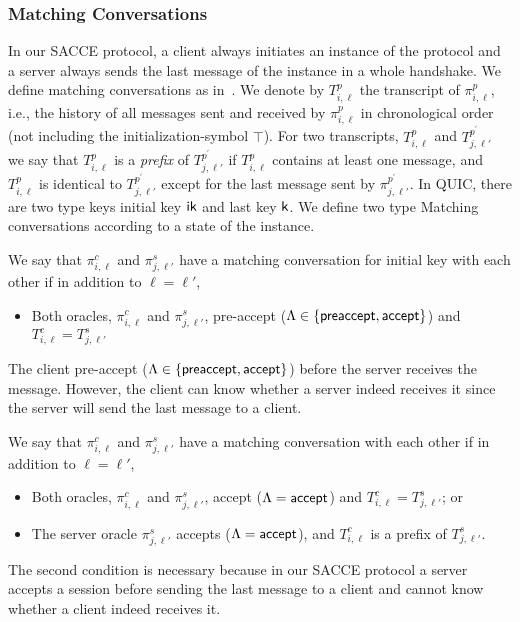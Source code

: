 \subsubsection{Matching Conversations}
In our SACCE protocol, a client always initiates an
instance of the protocol and a server always sends the
last message of the instance in a whole handshake.
We define matching conversations as in~\cite{JKSS12:ACCE}.
We denote by $T^p_{i,\ell}$ the transcript of
$\pi^p_{i,\ell}$, i.e., the history of all messages sent
and received by $\pi^p_{i,\ell}$ in chronological order
(not including the initialization-symbol $\top$).
For two transcripts, $T^p_{i,\ell}$ and
$T^{p^{\prime}}_{j,\ell'}$ we say that $T^p_{i,\ell}$
is a \textit{prefix} of $T^{p^{\prime}}_{j,\ell'}$ if
$T^p_{i,\ell}$ contains at least one message, and
$T^p_{i,\ell}$ is identical to
$T^{p^{\prime}}_{j,\ell'}$ except for the last message sent
by $\pi^{p^{\prime}}_{j,\ell'}$.
In QUIC, there are two type keys initial key $\mathsf{ik}$ and
last key $\mathsf{k}$.
We define two type Matching conversations according to
a state of the instance.

\begin{definition}
 We say that $\pi^c_{i,\ell}$ and $\pi^s_{j,\ell'}$ have
 a matching conversation for initial key with each other if
 in addition to $\ell=\ell'$,
 \begin{itemize}
  \item{Both oracles, $\pi^c_{i, \ell}$ and
  $\pi^s_{j,\ell'}$, pre-accept ($\Lambda \in \{\mathsf{preaccept}, \mathsf{accept} \}$) and
  $T^c_{i,\ell} = T^s_{j,\ell'}$}
 \end{itemize}
\end{definition}
\begin{remark}
 The client pre-accept ($\Lambda \in \{\mathsf{preaccept}, \mathsf{accept} \}$) before the
 server receives the message. However, the client can know whether
 a server indeed receives it since the server will send the
 last message to a client.
\end{remark}
\begin{definition}
 We say that $\pi^c_{i,\ell}$ and $\pi^s_{j,\ell'}$ have
 a matching conversation with each other if in addition
 to $\ell=\ell'$,
 \begin{itemize}
  \item{Both oracles, $\pi^c_{i, \ell}$ and
  $\pi^s_{j,\ell'}$, accept ($\Lambda = \mathsf{accept}$) and
  $T^c_{i,\ell} = T^s_{j,\ell'}$; or}

  \item{The server oracle $\pi^s_{j, \ell'}$ accepts
  ($\Lambda = \mathsf{accept}$),
  and $T^c_{i,\ell}$ is a prefix of $T^s_{j,\ell'}$.}
 \end{itemize}
\end{definition}
\begin{remark}
 The second condition is necessary because in our SACCE
 protocol a server accepts a session before sending the
 last message to a client and cannot know whether a
 client indeed receives it.
\end{remark}


